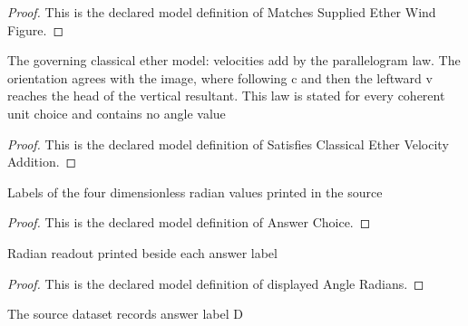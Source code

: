 \begin{proof}
  This is the declared model definition of Matches Supplied Ether Wind Figure.
\end{proof}
\begin{definition}
  \label{def:physics:phyx-mini-0524:phyxminiproblems-problemphyxmini0524-satisfiesclassicalethervelocityaddition}
  The governing classical ether model: velocities add by the parallelogram law. The orientation agrees with the image, where following c and then the leftward v reaches the head of the vertical resultant. This law is stated for every coherent unit choice and contains no angle value
\end{definition}
\begin{proof}
  This is the declared model definition of Satisfies Classical Ether Velocity Addition.
\end{proof}
\begin{definition}
  \label{def:physics:phyx-mini-0524:phyxminiproblems-problemphyxmini0524-answerchoice}
  Labels of the four dimensionless radian values printed in the source
\end{definition}
\begin{proof}
  This is the declared model definition of Answer Choice.
\end{proof}
\begin{definition}
  \label{def:physics:phyx-mini-0524:phyxminiproblems-problemphyxmini0524-displayedangleradians}
  Radian readout printed beside each answer label
\end{definition}
\begin{proof}
  This is the declared model definition of displayed Angle Radians.
\end{proof}
\begin{definition}
  \label{def:physics:phyx-mini-0524:phyxminiproblems-problemphyxmini0524-recordeddatasetanswer}
  The source dataset records answer label D
\end{definition}
